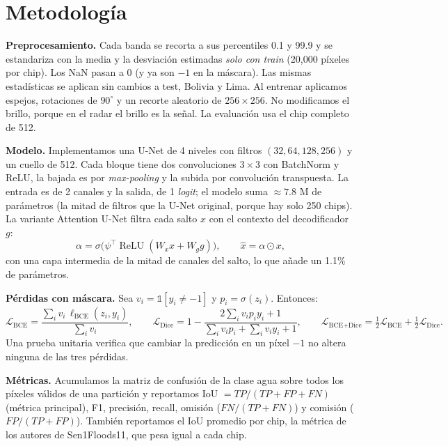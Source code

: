 \documentclass{article}
\begin{document}
\section{Metodología}

\textbf{Preprocesamiento.} Cada banda se recorta a sus percentiles 0.1 y 99.9 y se estandariza con la media y la desviación estimadas \emph{solo con train} (20,000 píxeles por chip). Los NaN pasan a 0 (y ya son $-1$ en la máscara). Las mismas estadísticas se aplican sin cambios a test, Bolivia y Lima. Al entrenar aplicamos espejos, rotaciones de $90^\circ$ y un recorte aleatorio de $256 \times 256$. No modificamos el brillo, porque en el radar el brillo es la señal. La evaluación usa el chip completo de 512.

\textbf{Modelo.} Implementamos una U-Net \citep{ronneberger2015} de 4 niveles con filtros $(32, 64, 128, 256)$ y un cuello de 512. Cada bloque tiene dos convoluciones $3\times3$ con BatchNorm y ReLU, la bajada es por \emph{max-pooling} y la subida por convolución transpuesta. La entrada es de 2 canales y la salida, de 1 \emph{logit}; el modelo suma $\approx 7.8$ M de parámetros (la mitad de filtros que la U-Net original, porque hay solo 250 chips). La variante Attention U-Net \citep{oktay2018} filtra cada salto $x$ con el contexto del decodificador $g$:
\begin{equation}
  \alpha = \sigma\!\big(\psi^\top \operatorname{ReLU}(W_x x + W_g g)\big), \qquad \hat{x} = \alpha \odot x,
\end{equation}
con una capa intermedia de la mitad de canales del salto, lo que añade un 1.1\% de parámetros.

\textbf{Pérdidas con máscara.} Sea $v_i = \mathbb{1}[y_i \neq -1]$ y $p_i = \sigma(z_i)$. Entonces:
\begin{equation}
  \mathcal{L}_\text{BCE} = \frac{\sum_i v_i\,\ell_\text{BCE}(z_i, y_i)}{\sum_i v_i}, \qquad
  \mathcal{L}_\text{Dice} = 1 - \frac{2 \sum_i v_i p_i y_i + 1}{\sum_i v_i p_i + \sum_i v_i y_i + 1}, \qquad
  \mathcal{L}_\text{BCE+Dice} = \tfrac12 \mathcal{L}_\text{BCE} + \tfrac12 \mathcal{L}_\text{Dice}.
\end{equation}
Una prueba unitaria verifica que cambiar la predicción en un píxel $-1$ no altera ninguna de las tres pérdidas.

\textbf{Métricas.} Acumulamos la matriz de confusión de la clase agua sobre todos los píxeles válidos de una partición y reportamos IoU $= TP/(TP+FP+FN)$ (métrica principal), F1, precisión, recall, omisión ($FN/(TP+FN)$) y comisión ($FP/(TP+FP)$). También reportamos el IoU promedio por chip, la métrica de los autores de Sen1Floods11, que pesa igual a cada chip.
\end{document}
